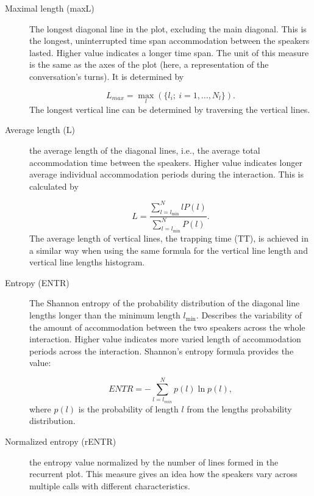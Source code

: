 \begin{description}
	\item[Maximal length (maxL)] The longest diagonal line in the plot, excluding the main diagonal.	
	This is the longest, uninterrupted time span accommodation between the speakers lasted.
	Higher value indicates a longer time span.
	The unit of this measure is the same as the axes of the plot (here, a representation of the conversation's turns).
	It is determined by

	\begin{equation}
		\label{eq:maxl}
		L_{max} = \max_{l} (\{l_i; \ i=1, \ldots, N_l\}).
	\end{equation}
	The longest vertical line can be determined by traversing the vertical lines.
	
	\item[Average length (L)] the average length of the diagonal lines, i.e., the average total accommodation time between the speakers.
	Higher value indicates longer average individual accommodation periods during the interaction.
	This is calculated by
	
	\begin{equation}
		\label{eq:l}
		L = \frac{\sum_{l=l_{\min}}^N l P(l)}{\sum_{l=l_{\min}}^N  P(l)}.
	\end{equation}
	The average length of vertical lines, the trapping time (TT), is achieved in a similar way when using the same formula for the vertical line length and vertical line lengths histogram.

	
	\item[Entropy (ENTR)]The Shannon entropy of the probability distribution of the diagonal line lengths longer than the minimum length $l_{\min}$.
	Describes the variability of the amount of accommodation between the two speakers across the whole interaction.
	Higher value indicates more varied length of accommodation periods across the interaction.
	Shannon's entropy formula provides the value:
	
	\begin{equation}
		\label{eq:entr}
		ENTR = -\sum_{l=l_{min}}^{N} p(l) \ln p(l),
	\end{equation}
	where $p(l)$ is the probability of length $l$ from the lengths probability distribution.
	\item[Normalized entropy (rENTR)] the entropy value normalized by the number of lines formed in the recurrent plot.
	This measure gives an idea how the speakers vary across multiple calls with different characteristics.
	
\end{description}

